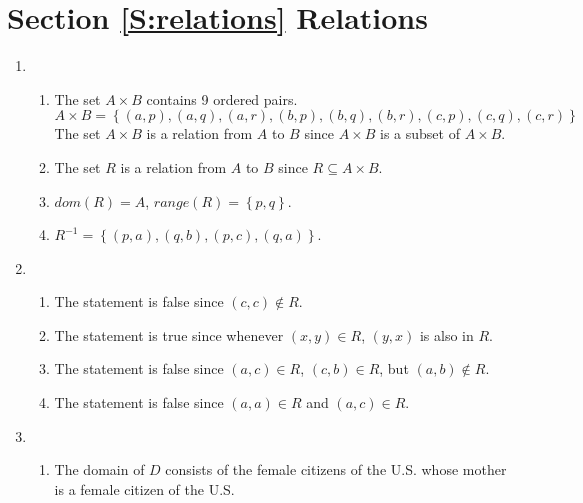 \section*{Section \ref{S:relations} Relations}

\begin{enumerate}
\item \begin{enumerate}
\item The set  $A \times B$  contains  9  ordered pairs.  
\[
A \times B = \left\{ \left( a, p \right), \left( a, q \right), \left( a, r \right), 
\left( b, p \right), \left( b, q \right), \left( b, r \right), 
\left( c, p \right), \left( c, q \right), \left( c, r \right) \right\}
\]
The set  $A \times B$  is a relation from  $A$  to  $B$  since $A \times B$  is a subset of  $A \times B$.

\item The set  $R$  is a relation from  $A$  to  $B$  since  $R \subseteq A \times B$.

\item $dom\left( R \right) = A$, $range\left( R \right) = \left\{ {p, q} \right\}$.

\item $R^{ - 1}  = \left\{ {\left( {p, a} \right), \left( {q, b} \right), \left( {p, c} \right), \left( {q, a} \right)} \right\}$.
\end{enumerate}



\item \begin{enumerate}
\item The statement is false since $\left( c, c \right) \notin R$.
\item The statement is true since whenever $\left( x, y \right) \in R$, $\left( y, x \right)$ is also in $R$.
\item The statement is false since $\left( a, c \right) \in R$, $\left( c, b \right) \in R$, but 
$\left( a, b \right) \notin R$.
\item The statement is false since $\left( a, a \right) \in R$ and $\left( a, c \right) \in R$.
\end{enumerate}



\item \begin{enumerate}
\item The domain of  $D$  consists of the female citizens of the U.S. whose mother is a female citizen of the U.S.


\end{enumerate}
\end{enumerate}
